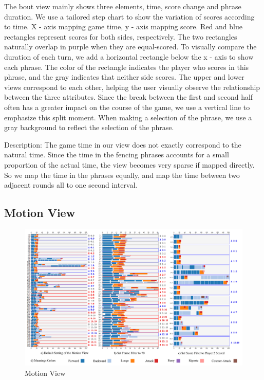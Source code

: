 \documentclass[journal]{vgtc}                %
\begin{document}
The bout view mainly shows three elements, time, score change and phrase duration.
We use a tailored step chart to show the variation of scores according to time.
X - axis mapping game time, y - axis mapping score.
Red and blue rectangles represent scores for both sides, respectively.
The two rectangles naturally overlap in purple when they are equal-scored.
To visually compare the duration of each turn, we add a horizontal rectangle below the x - axis to show each phrase.
The color of the rectangle indicates the player who scores in this phrase, and the gray indicates that neither side scores.
The upper and lower views correspond to each other, helping the user visually observe the relationship between the three attributes.
Since the break between the first and second half often has a greater impact on the course of the game, we use a vertical line to emphasize this split moment.
When making a selection of the phrase, we use a gray background to reflect the selection of the phrase.

Description: The game time in our view does not exactly correspond to the natural time.
Since the time in the fencing phrases accounts for a small proportion of the actual time, the view becomes very sparse if mapped directly.
So we map the time in the phrases equally, and map the time between two adjacent rounds all to one second interval.

\subsection{Motion View}

\begin{figure}[tb]
	\centering
	\includegraphics[width=\linewidth]{motionview}
	\caption{Motion View}
	\label{fig:motionview}
\end{figure}
\end{document}
